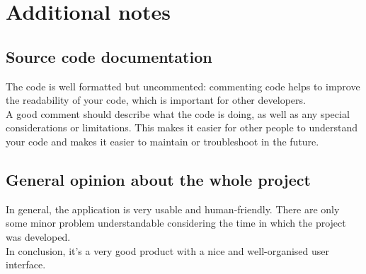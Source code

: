 \chapter{Additional notes}
    \section{Source code documentation}
    The code is well formatted but uncommented: commenting code helps to improve the readability of your code, which is important for other developers.\\
    A good comment should describe what the code is doing, as well as any special considerations or limitations. This makes it easier for other people to understand your code and makes it easier to maintain or troubleshoot in the future. 
    \section{General opinion about the whole project}
    In general, the application is very usable and human-friendly. There are only some minor problem understandable considering the time in which the project was developed.\\
    In conclusion, it's a very good product with a nice and well-organised user interface.
